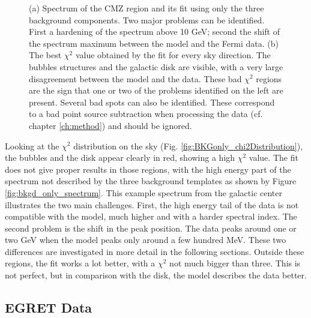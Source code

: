 \begin{figure}[h]
\begin{minipage}[h]{0.45\textwidth}
	  \subcaption{}
	  \label{fig:BKGonly_chi2Distribution}
  \end{minipage}
  \caption[CMZ fitted with the background components.]{(a) Spectrum of the CMZ region and its fit using only the three background components. Two major problems can be identified. First a hardening of the spectrum above 10 GeV; second the shift of the spectrum maximum between the model and the Fermi data. (b) The best $\chi^2$ value obtained by the fit for every sky direction. The bubbles structures and the galactic disk are visible, with a very large disagreement between the model and the data. These bad $\chi^2$ regions are the sign that one or two of the problems identified on the left are present. Several bad spots can also be identified. These correspond to a bad point source subtraction when processing the data (cf. chapter \ref{ch:method}) and should be ignored.}
  \label{}
\end{figure}


Looking at the $\chi^2$ distribution on the sky (Fig. \ref{fig:BKGonly_chi2Distribution}), the bubbles and the disk appear clearly in red, showing a high $\chi^2$ value. The fit does not give proper results in those regions, with the high energy part of the spectrum not described by the three background templates as shown by Figure \ref{fig:bkgd_only_spectrum}. This example spectrum from the galactic center illustrates the two main challenges. First, the high energy tail of the data is not compatible with the model, much higher and with a harder spectral index. The second problem is the shift in the peak position. The data peaks around one or two GeV when the model peaks only around a few hundred MeV. These two differences are investigated in more detail in the following sections.
Outside these regions, the fit works a lot better, with a $\chi^2$ not much bigger than three. This is not perfect, but in comparison with the disk, the model describes the data better.



\newpage
\subsection{EGRET Data}

